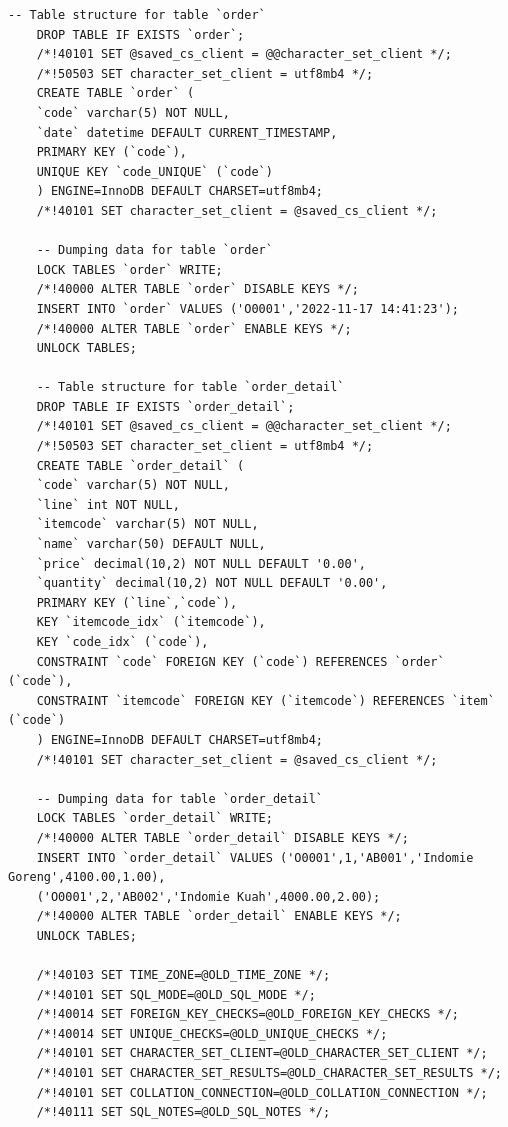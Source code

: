 \begin{lstlisting}[style=JavaStyle]
	-- Table structure for table `order`
	DROP TABLE IF EXISTS `order`;
	/*!40101 SET @saved_cs_client = @@character_set_client */;
	/*!50503 SET character_set_client = utf8mb4 */;
	CREATE TABLE `order` (
	`code` varchar(5) NOT NULL,
	`date` datetime DEFAULT CURRENT_TIMESTAMP,
	PRIMARY KEY (`code`),
	UNIQUE KEY `code_UNIQUE` (`code`)
	) ENGINE=InnoDB DEFAULT CHARSET=utf8mb4;
	/*!40101 SET character_set_client = @saved_cs_client */;
	
	-- Dumping data for table `order`
	LOCK TABLES `order` WRITE;
	/*!40000 ALTER TABLE `order` DISABLE KEYS */;
	INSERT INTO `order` VALUES ('O0001','2022-11-17 14:41:23');
	/*!40000 ALTER TABLE `order` ENABLE KEYS */;
	UNLOCK TABLES;
	
	-- Table structure for table `order_detail`
	DROP TABLE IF EXISTS `order_detail`;
	/*!40101 SET @saved_cs_client = @@character_set_client */;
	/*!50503 SET character_set_client = utf8mb4 */;
	CREATE TABLE `order_detail` (
	`code` varchar(5) NOT NULL,
	`line` int NOT NULL,
	`itemcode` varchar(5) NOT NULL,
	`name` varchar(50) DEFAULT NULL,
	`price` decimal(10,2) NOT NULL DEFAULT '0.00',
	`quantity` decimal(10,2) NOT NULL DEFAULT '0.00',
	PRIMARY KEY (`line`,`code`),
	KEY `itemcode_idx` (`itemcode`),
	KEY `code_idx` (`code`),
	CONSTRAINT `code` FOREIGN KEY (`code`) REFERENCES `order` (`code`),
	CONSTRAINT `itemcode` FOREIGN KEY (`itemcode`) REFERENCES `item` (`code`)
	) ENGINE=InnoDB DEFAULT CHARSET=utf8mb4;
	/*!40101 SET character_set_client = @saved_cs_client */;
	
	-- Dumping data for table `order_detail`
	LOCK TABLES `order_detail` WRITE;
	/*!40000 ALTER TABLE `order_detail` DISABLE KEYS */;
	INSERT INTO `order_detail` VALUES ('O0001',1,'AB001','Indomie Goreng',4100.00,1.00),
	('O0001',2,'AB002','Indomie Kuah',4000.00,2.00);
	/*!40000 ALTER TABLE `order_detail` ENABLE KEYS */;
	UNLOCK TABLES;
	
	/*!40103 SET TIME_ZONE=@OLD_TIME_ZONE */;
	/*!40101 SET SQL_MODE=@OLD_SQL_MODE */;
	/*!40014 SET FOREIGN_KEY_CHECKS=@OLD_FOREIGN_KEY_CHECKS */;
	/*!40014 SET UNIQUE_CHECKS=@OLD_UNIQUE_CHECKS */;
	/*!40101 SET CHARACTER_SET_CLIENT=@OLD_CHARACTER_SET_CLIENT */;
	/*!40101 SET CHARACTER_SET_RESULTS=@OLD_CHARACTER_SET_RESULTS */;
	/*!40101 SET COLLATION_CONNECTION=@OLD_COLLATION_CONNECTION */;
	/*!40111 SET SQL_NOTES=@OLD_SQL_NOTES */;
\end{lstlisting}

